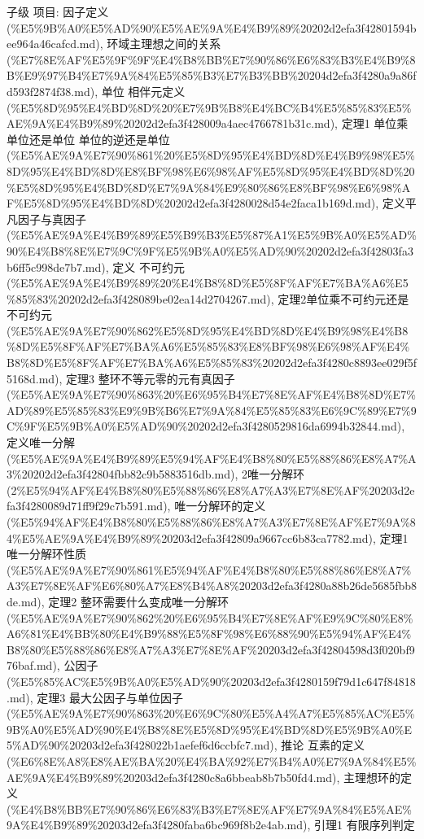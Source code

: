 \begin{note}[第四章整环里面的因子分解]

子级 项目: 因子定义 (\%E5\%9B\%A0\%E5\%AD\%90\%E5\%AE\%9A\%E4\%B9\%89\%20202d2efa3f42801594bee964a46cafcd.md), 环域主理想之间的关系 (\%E7\%8E\%AF\%E5\%9F\%9F\%E4\%B8\%BB\%E7\%90\%86\%E6\%83\%B3\%E4\%B9\%8B\%E9\%97\%B4\%E7\%9A\%84\%E5\%85\%B3\%E7\%B3\%BB\%20204d2efa3f4280a9a86fd593f2874f38.md), 单位 相伴元定义 (\%E5\%8D\%95\%E4\%BD\%8D\%20\%E7\%9B\%B8\%E4\%BC\%B4\%E5\%85\%83\%E5\%AE\%9A\%E4\%B9\%89\%20202d2efa3f428009a4aec4766781b31c.md), 定理1 单位乘单位还是单位 单位的逆还是单位 (\%E5\%AE\%9A\%E7\%90\%861\%20\%E5\%8D\%95\%E4\%BD\%8D\%E4\%B9\%98\%E5\%8D\%95\%E4\%BD\%8D\%E8\%BF\%98\%E6\%98\%AF\%E5\%8D\%95\%E4\%BD\%8D\%20\%E5\%8D\%95\%E4\%BD\%8D\%E7\%9A\%84\%E9\%80\%86\%E8\%BF\%98\%E6\%98\%AF\%E5\%8D\%95\%E4\%BD\%8D\%20202d2efa3f4280028d54e2faca1b169d.md), 定义平凡因子与真因子 (\%E5\%AE\%9A\%E4\%B9\%89\%E5\%B9\%B3\%E5\%87\%A1\%E5\%9B\%A0\%E5\%AD\%90\%E4\%B8\%8E\%E7\%9C\%9F\%E5\%9B\%A0\%E5\%AD\%90\%20202d2efa3f42803fa3b6ff5c998de7b7.md), 定义 不可约元 (\%E5\%AE\%9A\%E4\%B9\%89\%20\%E4\%B8\%8D\%E5\%8F\%AF\%E7\%BA\%A6\%E5\%85\%83\%20202d2efa3f428089be02ea14d2704267.md), 定理2单位乘不可约元还是不可约元 (\%E5\%AE\%9A\%E7\%90\%862\%E5\%8D\%95\%E4\%BD\%8D\%E4\%B9\%98\%E4\%B8\%8D\%E5\%8F\%AF\%E7\%BA\%A6\%E5\%85\%83\%E8\%BF\%98\%E6\%98\%AF\%E4\%B8\%8D\%E5\%8F\%AF\%E7\%BA\%A6\%E5\%85\%83\%20202d2efa3f4280c8893ee029f5f5168d.md), 定理3 整环不等元零的元有真因子 (\%E5\%AE\%9A\%E7\%90\%863\%20\%E6\%95\%B4\%E7\%8E\%AF\%E4\%B8\%8D\%E7\%AD\%89\%E5\%85\%83\%E9\%9B\%B6\%E7\%9A\%84\%E5\%85\%83\%E6\%9C\%89\%E7\%9C\%9F\%E5\%9B\%A0\%E5\%AD\%90\%20202d2efa3f4280529816da6994b32844.md), 定义唯一分解 (\%E5\%AE\%9A\%E4\%B9\%89\%E5\%94\%AF\%E4\%B8\%80\%E5\%88\%86\%E8\%A7\%A3\%20202d2efa3f42804fbb82c9b5883516db.md), 2唯一分解环 (2\%E5\%94\%AF\%E4\%B8\%80\%E5\%88\%86\%E8\%A7\%A3\%E7\%8E\%AF\%20203d2efa3f4280089d71ff9f29c7b591.md), 唯一分解环的定义 (\%E5\%94\%AF\%E4\%B8\%80\%E5\%88\%86\%E8\%A7\%A3\%E7\%8E\%AF\%E7\%9A\%84\%E5\%AE\%9A\%E4\%B9\%89\%20203d2efa3f42809a9667cc6b83ca7782.md), 定理1唯一分解环性质 (\%E5\%AE\%9A\%E7\%90\%861\%E5\%94\%AF\%E4\%B8\%80\%E5\%88\%86\%E8\%A7\%A3\%E7\%8E\%AF\%E6\%80\%A7\%E8\%B4\%A8\%20203d2efa3f4280a88b26de5685fbb8de.md), 定理2 整环需要什么变成唯一分解环 (\%E5\%AE\%9A\%E7\%90\%862\%20\%E6\%95\%B4\%E7\%8E\%AF\%E9\%9C\%80\%E8\%A6\%81\%E4\%BB\%80\%E4\%B9\%88\%E5\%8F\%98\%E6\%88\%90\%E5\%94\%AF\%E4\%B8\%80\%E5\%88\%86\%E8\%A7\%A3\%E7\%8E\%AF\%20203d2efa3f42804598d3f020bf976baf.md), 公因子 (\%E5\%85\%AC\%E5\%9B\%A0\%E5\%AD\%90\%20203d2efa3f4280159f79d1c647f84818.md), 定理3 最大公因子与单位因子 (\%E5\%AE\%9A\%E7\%90\%863\%20\%E6\%9C\%80\%E5\%A4\%A7\%E5\%85\%AC\%E5\%9B\%A0\%E5\%AD\%90\%E4\%B8\%8E\%E5\%8D\%95\%E4\%BD\%8D\%E5\%9B\%A0\%E5\%AD\%90\%20203d2efa3f428022b1aefef6d6ccbfc7.md), 推论 互素的定义 (\%E6\%8E\%A8\%E8\%AE\%BA\%20\%E4\%BA\%92\%E7\%B4\%A0\%E7\%9A\%84\%E5\%AE\%9A\%E4\%B9\%89\%20203d2efa3f4280c8a6bbeab8b7b50fd4.md), 主理想环的定义 (\%E4\%B8\%BB\%E7\%90\%86\%E6\%83\%B3\%E7\%8E\%AF\%E7\%9A\%84\%E5\%AE\%9A\%E4\%B9\%89\%20203d2efa3f4280faba6bc969f8b2e4ab.md), 引理1 有限序列判定 
\end{note}
